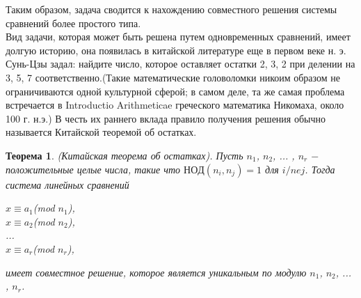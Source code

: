 \documentclass[11pt]{article}
\newtheorem{theorem}{Теорема}
\begin{document}
	Таким образом, задача сводится к нахождению совместного решения системы сравнений более простого типа.\\
	Вид задачи, которая может быть решена путем одновременных сравнений, имеет долгую историю, она появилась в китайской литературе еще в первом веке н. э. Сунь-Цзы задал: найдите число, которое оставляет остатки 2, 3, 2 при делении на 3, 5, 7 соответственно.(Такие математические головоломки никоим образом не ограничиваются одной культурной сферой; в самом деле, та же самая проблема встречается в Introductio Arithmeticae греческого математика Никомаха, около 100 г. н.э.) В честь их раннего вклада правило получения решения обычно называется Китайской теоремой об остатках.\\
	
	\begin{theorem}
		(Китайская теорема об остатках). \textit{Пусть $n_{1}$, $n_{2}$, ... , $n_{r}$ $-$ положительные целые числа, такие что $НОД(n_{i}, n_{j}) = 1$ для $i /ne j$. Тогда система линейных сравнений}
			\begin{center}
				$x \equiv a_{1}$(mod $n_{1}$),\\
				$x \equiv a_{2}$(mod $n_{2}$),\\
				...\\
				$x \equiv a_{r}$(mod $n_{r}$),\\
			\end{center}
			
		\textit{имеет совместное решение, которое является уникальным по модулю $n_{1}$, $n_{2}$, ... , $n_{r}$. } 
	\end{theorem}
\end{document}
